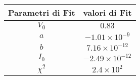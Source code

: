 \begin{tabular}{cc}
\hline
	Parametri di Fit & valori di Fit\\ 
\hline
	$V_0$ & $0.83$ \\
	$a$ & $-1.01\times 10^{-9}$ \\
	$b$ & $7.16\times 10^{-12}$ \\
	$I_0$ & $-2.49\times 10^{-12}$ \\
	$\chi^2$ & $2.4\times 10^{2}$ \\
\hline
\end{tabular}
